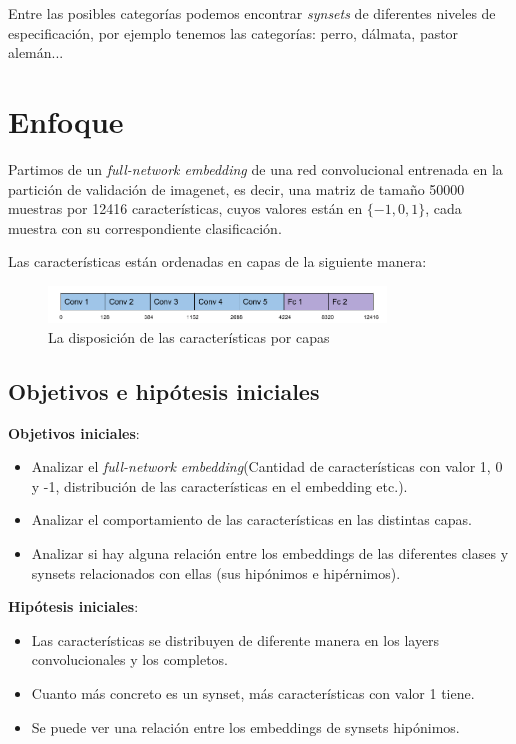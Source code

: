 \documentclass[12,twoside]{TFG-GM}
\theoremstyle{definition}
\theoremstyle{remark}
\begin{document}
Entre las posibles categorías podemos encontrar \textit{synsets} de diferentes niveles de especificación, por ejemplo tenemos las categorías: perro, dálmata, pastor alemán... 

\section{Enfoque}
Partimos de un \textit{full-network embedding} de una red convolucional entrenada en la partición de validación de imagenet, es decir, una matriz de tamaño 50000 muestras por 12416 características, cuyos valores están en $\{-1,0,1\}$, cada muestra con su correspondiente clasificación.

Las características están ordenadas en capas de la siguiente manera: 
\begin{figure}[h]
\label{}
\centering
\includegraphics[width = 0.8\textwidth]{Images/croplayer.png} 
\caption{La disposición de las características por capas}
\end{figure}


\subsection{Objetivos e hipótesis iniciales}
\textbf{Objetivos iniciales}: 
\begin{itemize}
\item Analizar el \textit{full-network embedding}(Cantidad de características con valor 1, 0 y -1, distribución de las características en el embedding etc.). 
\item Analizar el comportamiento de las características en las distintas capas. 
\item Analizar si hay alguna relación entre los embeddings de las diferentes clases y synsets relacionados con ellas (sus hipónimos e hipérnimos). 
\end{itemize}

\textbf{Hipótesis iniciales}: 
\begin{itemize}
\item Las características se distribuyen de diferente manera en los layers convolucionales y los completos.
\item Cuanto más concreto es un synset, más características con valor 1 tiene.
\item Se puede ver una relación entre los embeddings de synsets hipónimos.
\end{itemize}
\end{document}
